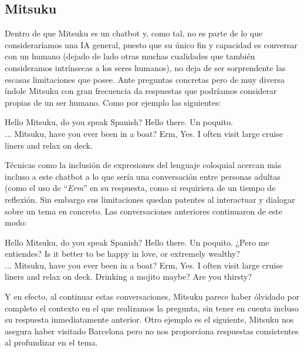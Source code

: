 \documentclass[final]{CSP}
\begin{document}
\subsection{Mitsuku}

Dentro de que Mitsuku es un chatbot y, como tal, no es parte de lo que consideraríamos una IA
general, puesto que su único fin y capacidad es conversar con un humano (dejado de lado otras 
muchas cualidades que también consideramos intrínsecas a los seres humanos), no deja de ser 
sorprendente las escasas limitaciones que posee. Ante preguntas concretas pero de muy diversa 
índole Mitsuku con gran frecuencia da respuestas que podríamos considerar propias de un ser humano.
Como por ejemplo las siguientes:

\begin{drama}
    
  \hspeaks Hello Mitsuku, do you speak Spanish?
  \mspeaks Hello there. Un poquito. \\
  ...
  \hspeaks Mitsuku, have you ever been in a boat?
  \mspeaks Erm, Yes. I often visit large cruise liners and relax on deck. \\
\end{drama}

Técnicas como la inclusión de expresiones del lenguaje coloquial acercan más incluso a este 
chatbot a lo que sería una conversación entre personas adultas (como el uso de ``\textit{Erm}''
en su respuesta, como si requiriera de un tiempo de reflexión. Sin embargo sus limitaciones quedan
patentes al interactuar y dialogar sobre un tema en concreto. Las conversaciones anteriores 
continuaron de este modo:

\begin{drama}
    
  \hspeaks Hello Mitsuku, do you speak Spanish?
  \mspeaks Hello there. Un poquito.
  \hspeaks ¿Pero me entiendes?
  \mspeaks Is it better to be happy in love, or extremely wealthy? \\
  ... 
  \hspeaks Mitsuku, have you ever been in a boat?
  \mspeaks Erm, Yes. I often visit large cruise liners and relax on deck.
  \hspeaks Drinking a mojito maybe?
  \mspeaks Are you thirsty? 
\end{drama}

Y en efecto, al continuar estas conversaciones, Mitsuku parece haber ólvidado por completo el 
contexto en el que realizamos la pregunta, sin tener en cuenta incluso su respuesta inmediatamente
anterior. Otro ejemplo es el siguiente, Mitsuku nos asegura haber visitado Barcelona pero no nos
proporciona respuestas consistentes al profundizar en el tema.
\end{document}
